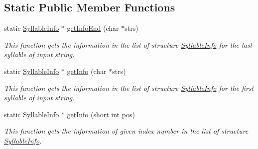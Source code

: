 \subsection*{Static Public Member Functions}
\begin{CompactItemize}
\item 
static \hyperlink{structkmaOrange_1_1SyllableInfo}{SyllableInfo} $\ast$ \hyperlink{classkmaOrange_1_1ExCP949_bec82a4143b93be47cadd1ce7e259c2c}{getInfoEnd} (char $\ast$strs)
\begin{CompactList}\small\item\em This function gets the information in the list of structure \hyperlink{structkmaOrange_1_1SyllableInfo}{SyllableInfo} for the last syllable of input string. \item\end{CompactList}\item 
static \hyperlink{structkmaOrange_1_1SyllableInfo}{SyllableInfo} $\ast$ \hyperlink{classkmaOrange_1_1ExCP949_2e89cf267a9f3c61e97a7c015f2891b7}{getInfo} (char $\ast$strs)
\begin{CompactList}\small\item\em This function gets the information in the list of structure \hyperlink{structkmaOrange_1_1SyllableInfo}{SyllableInfo} for the first syllable of input string. \item\end{CompactList}\item 
static \hyperlink{structkmaOrange_1_1SyllableInfo}{SyllableInfo} $\ast$ \hyperlink{classkmaOrange_1_1ExCP949_338fb0a3df2e8ea4ae62655e32040dda}{getInfo} (short int pos)
\begin{CompactList}\small\item\em This function gets the information of given index number in the list of structure \hyperlink{structkmaOrange_1_1SyllableInfo}{SyllableInfo}. \item\end{CompactList}\end{CompactItemize}
